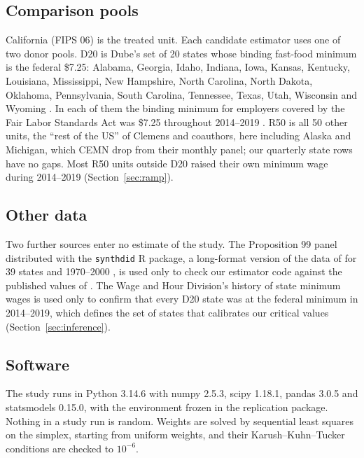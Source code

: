 \subsection{Comparison pools}
\label{sec:pools}

California (FIPS 06) is the treated unit. Each candidate estimator uses one of two donor pools.
D20 is Dube's set of 20 states whose binding fast-food minimum is the federal \$7.25: Alabama,
Georgia, Idaho, Indiana, Iowa, Kansas, Kentucky, Louisiana, Mississippi, New Hampshire, North
Carolina, North Dakota, Oklahoma, Pennsylvania, South Carolina, Tennessee, Texas, Utah, Wisconsin
and Wyoming \citep{dube2026labor}. In each of them the binding minimum for employers covered by
the Fair Labor Standards Act was \$7.25 throughout 2014--2019 \citep{dolwhd2025history,dolwhd2026state}.
R50 is all 50 other units, the ``rest of the US'' of Clemens and coauthors, here including Alaska
and Michigan, which CEMN drop from their monthly panel; our quarterly state rows have no gaps.
Most R50 units outside D20 raised their own minimum wage during 2014--2019
(Section~\ref{sec:ramp}).

\subsection{Other data}

Two further sources enter no estimate of the study. The Proposition 99 panel distributed with the
\texttt{synthdid} R package, a long-format version of the data of \citet{abadie2010synthetic} for
39 states and 1970--2000 \citep{synthdidpackage}, is used only to check our estimator code against
the published values of \citet[Table~1]{arkhangelsky2021synthetic}. The Wage and Hour Division's
history of state minimum wages \citep{dolwhd2025history} is used only to confirm that every D20
state was at the federal minimum in 2014--2019, which defines the set of states that calibrates our
critical values (Section~\ref{sec:inference}).

\subsection{Software}

The study runs in Python 3.14.6 with numpy 2.5.3, scipy 1.18.1, pandas 3.0.5 and statsmodels
0.15.0, with the environment frozen in the replication package. Nothing in a study run is random.
Weights are solved by sequential least squares on the simplex, starting from uniform weights, and
their Karush--Kuhn--Tucker conditions are checked to $10^{-6}$.
